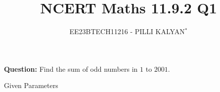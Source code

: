 \documentclass[journal,12pt,twocolumn]{IEEEtran}
\theoremstyle{remark}
\begin{document}

\vspace{3cm}
	\title{NCERT Maths 11.9.2 Q1}
	\author{EE23BTECH11216 - PILLI KALYAN$^{*}$%
	}
\maketitle
\newpage
\bigskip

\renewcommand{\thefigure}{\theenumi}
\renewcommand{\thetable}{\theenumi}

\vspace{3cm}
\maketitle
\textbf{Question:} 
Find the sum of odd numbers in $1$ to $2001$.

\fi

\begin{table}[h]
	\centering
	
	 	
	 	\caption{Given Parameters}
	 	\label{tab:11.9.2.1.1}
 \end{table}
\end{document}
